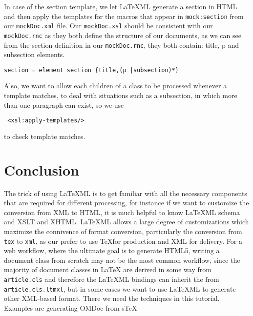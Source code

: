 \documentclass[a4paper]{article}
\def\latexml{{\LaTeX}ML\xspace}
\begin{document}
In case of the section template, we let \latexml generate a section in HTML and then apply the templates for the macros that appear in \lstinline|mock:section| from our \lstinline|mockDoc.xml| file. Our \lstinline|mockDoc.xsl| should be consistent with our \lstinline|mockDoc.rnc| as they both define the structure of our documents, as we can see from the section definition in our \lstinline|mockDoc.rnc|, they both contain: title, p and subsection elements.
\begin{lstlisting}
section = element section {title,(p |subsection)*}
\end{lstlisting}
Also, we want to allow each children of a class to be processed whenever a template matches, to deal with situations such as a subsection, in which more than one paragraph can exist, so we use
\begin{lstlisting}
 <xsl:apply-templates/>
\end{lstlisting}
to check template matches.

\section{Conclusion}\label{sec:concl}
The trick of using \latexml is to get familiar with all the necessary components that are required for different processing, for instance if we want to customize the conversion from XML to HTML, it is much helpful to know 
  \latexml schema and XSLT and XHTML. \latexml allows a large degree of customizations which maximize the connivence of format conversion, particularly the conversion from \lstinline|tex| to \lstinline|xml|, as our prefer to use  \TeX for production and XML for delivery. For a web workflow, where the ultimate goal is to generate HTML5, writing a document class from scratch may not be the most common workflow, since the majority of document classes in {\LaTeX} are derived in some way from \lstinline|article.cls| and therefore
  the \latexml bindings can inherit the from \lstinline|article.cls.ltmxl|, but in some
  cases we want to use \latexml to generate other XML-based format. There we need the
  techniques in this tutorial. Examples are generating OMDoc from s\TeX{}


\printbibliography
\newpage
\end{document}
